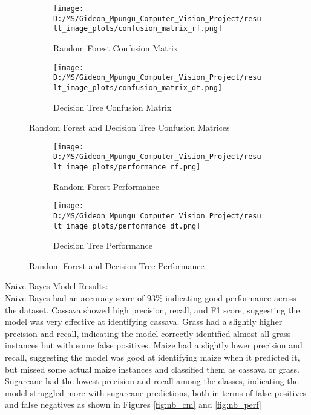 \documentclass[10pt,twocolumn,letterpaper]{article}
\begin{document}
\begin{figure*}[ht]
    \centering
    
    \begin{subfigure}{0.45\textwidth}
        \texttt{[image: D:/MS/Gideon\_Mpungu\_Computer\_Vision\_Project/result\_image\_plots/confusion\_matrix\_rf.png]}
        \caption{Random Forest Confusion Matrix}
        \label{fig:rf_cm}
    \end{subfigure}
    \hfill
    \begin{subfigure}{0.45\textwidth}
        \texttt{[image: D:/MS/Gideon\_Mpungu\_Computer\_Vision\_Project/result\_image\_plots/confusion\_matrix\_dt.png]}
        \caption{Decision Tree Confusion Matrix}
        \label{fig:dt_cm}
    \end{subfigure}
    
    \caption{Random Forest and Decision Tree Confusion Matrices}
    \label{fig:rf_and_dt_cm}
\end{figure*}

\begin{figure*}[ht]
    \centering
    
    \begin{subfigure}{0.45\textwidth}
        \texttt{[image: D:/MS/Gideon\_Mpungu\_Computer\_Vision\_Project/result\_image\_plots/performance\_rf.png]}
        \caption{Random Forest Performance}
        \label{fig:rf_perf}
    \end{subfigure}
    \hfill
    \begin{subfigure}{0.45\textwidth}
        \texttt{[image: D:/MS/Gideon\_Mpungu\_Computer\_Vision\_Project/result\_image\_plots/performance\_dt.png]}
        \caption{Decision Tree Performance}
        \label{fig:dt_perf}
    \end{subfigure}
    
    \caption{Random Forest and Decision Tree Performance}
    \label{fig:rf_and_dt_perf}
\end{figure*}

Naive Bayes Model Results:  \\

Naive Bayes had an accuracy score of 93\% indicating good performance across the dataset. Cassava showed high precision, recall, and F1 score, suggesting the model was very effective at identifying cassava. Grass had a slightly higher precision and recall, indicating the model correctly identified almost all grass instances but with some false positives. Maize had a slightly lower precision and recall, suggesting the model was good at identifying maize when it predicted it, but missed some actual maize instances and classified them as cassava or grass. Sugarcane had the lowest precision and recall among the classes, indicating the model struggled more with sugarcane predictions, both in terms of false positives and false negatives as shown in Figures \ref{fig:nb_cm} and \ref{fig:nb_perf}
\end{document}
